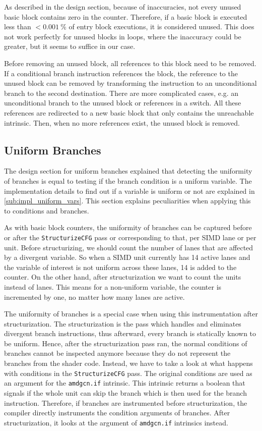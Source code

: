 As described in the design section, because of inaccuracies, not every unused basic block contains zero in the counter.
Therefore, if a basic block is executed less than $< \SI{0.001}{\percent}$ of entry block executions, it is considered unused.
This does not work perfectly for unused blocks in loops, where the inaccuracy could be greater, but it seems to suffice in our case.

Before removing an unused block, all references to this block need to be removed.
If a conditional branch instruction references the block, the reference to the unused block can be removed by transforming the instruction to an unconditional branch to the second destination.
There are more complicated cases, e.g. an unconditional branch to the unused block or references in a switch.
All these references are redirected to a new basic block that only contains the unreachable intrinsic.
Then, when no more references exist, the unused block is removed.

\subsection{Uniform Branches}
\label{sub:impl_uniform_branches}
The design section for uniform branches explained that detecting the uniformity of branches is equal to testing if the branch condition is a uniform variable.
The implementation details to find out if a variable is uniform or not are explained in \cref{sub:impl_uniform_vars}.
This section explains peculiarities when applying this to conditions and branches.

As with basic block counters, the uniformity of branches can be captured before or after the \texttt{StructurizeCFG} pass or corresponding to that, per SIMD lane or per unit.
Before structurizing, we should count the number of lanes that are affected by a divergent variable.
So when a SIMD unit currently has 14 active lanes and the variable of interest is not uniform across these lanes, 14 is added to the counter.
On the other hand, after structurization we want to count the units instead of lanes.
This means for a non-uniform variable, the counter is incremented by one, no matter how many lanes are active.

The uniformity of branches is a special case when using this instrumentation after structurization.
The structurization is the pass which handles and eliminates divergent branch instructions, thus afterward, every branch is statically known to be uniform.
Hence, after the structurization pass ran, the normal conditions of branches cannot be inspected anymore because they do not represent the branches from the shader code.
Instead, we have to take a look at what happens with conditions in the \texttt{StructurizeCFG} pass.
The original conditions are used as an argument for the \texttt{amdgcn.if} intrinsic.
This intrinsic returns a boolean that signals if the whole unit can skip the branch which is then used for the branch instruction.
Therefore, if branches are instrumented before structurization, the compiler directly instruments the condition arguments of branches.
After structurization, it looks at the argument of \texttt{amdgcn.if} intrinsics instead.

